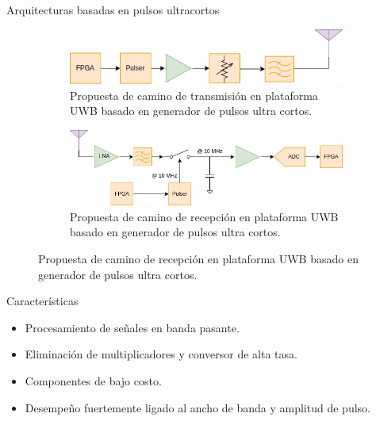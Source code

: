 \documentclass{beamer}
\begin{document}
\begin{frame}{Arquitecturas basadas en pulsos ultracortos}
    \begin{figure}[t]
        \centering
        \begin{subfigure}[b]{0.45\textwidth}
            \centering
            \includegraphics[width=\textwidth]{images/proposed_uwb_tx_path.drawio.png}
            \caption{Propuesta de camino de transmisión en plataforma UWB basado en
            generador de pulsos ultra cortos.}
            \label{fig:proposed_uwb_tx_path}
        \end{subfigure}
        \hfill
        \begin{subfigure}[b]{0.45\textwidth}
            \centering
            \includegraphics[width=\textwidth]{images/proposed_uwb_rx_path.drawio.png}
            \caption{Propuesta de camino de recepción en plataforma UWB basado en
            generador de pulsos ultra cortos.}
            \label{fig:proposed_uwb_rx_path}
        \end{subfigure}
        \label{fig:uwb_system_block_diagram}
    \end{figure}

    \begin{block}{Características}
        \begin{itemize}
            \item Procesamiento de señales en banda pasante.
            \item Eliminación de multiplicadores y conversor de alta tasa.
            \item Componentes de bajo costo.
            \item Desempeño fuertemente ligado al ancho de banda y amplitud de
                pulso.
        \end{itemize}
    \end{block}
\end{frame}
\end{document}

